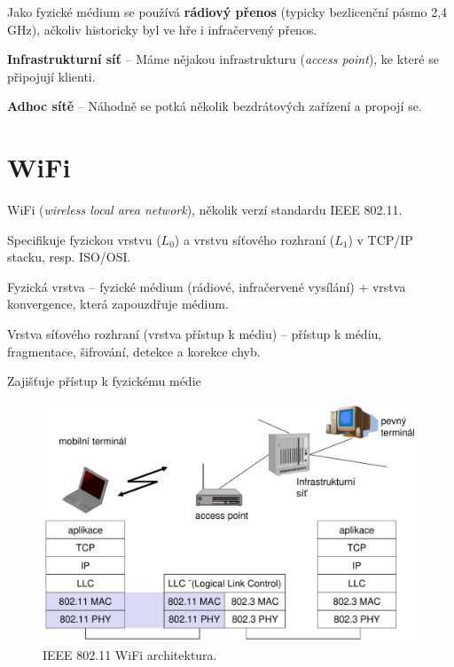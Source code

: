 \begin{compactitem}
    \item Jako fyzické médium se používá \textbf{rádiový přenos} (typicky bezlicenční pásmo 2,4\,GHz), ačkoliv historicky byl ve hře i infračervený přenos.

    \item \textbf{Infrastrukturní síť} -- Máme nějakou infrastrukturu (\textit{access point}), ke které se připojují klienti.

    \item \textbf{Adhoc sítě} -- Náhodně se potká několik bezdrátových zařízení a propojí se.
\end{compactitem}


\section{WiFi}

\begin{compactitem}
    \item WiFi (\textit{wireless local area network}), několik verzí standardu IEEE 802.11.

    \item Specifikuje fyzickou vrstvu ($L_0$) a vrstvu síťového rozhraní ($L_1$) v TCP/IP stacku, resp. ISO/OSI.

    \item Fyzická vrstva -- fyzické médium (rádiové, infračervené vysílání) + vrstva konvergence, která zapouzdřuje médium.

    \item Vrstva síťového rozhraní (vrstva přístup k médiu) -- přístup k médiu, fragmentace, šifrování, detekce a korekce chyb. \begin{compactitem}
        \item Zajišťuje přístup k fyzickému médie
    \end{compactitem}
\end{compactitem}

\begin{figure}[H]
    \centering
    \includegraphics[width=0.75\linewidth]{wifi-architektura.pdf}
    \caption{IEEE 802.11 WiFi architektura.}
\end{figure}


